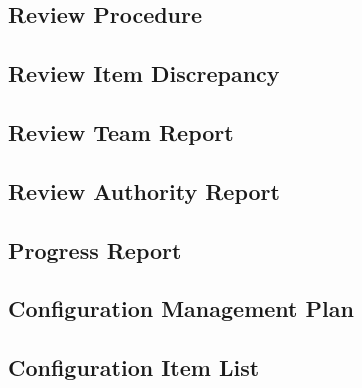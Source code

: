 \subsection{Review Procedure}
\label{sec:Review Procedure}


\subsection{Review Item Discrepancy}
\label{sec:Review Item Discrepancy}


\subsection{Review Team Report}
\label{sec:Review Team Report}


\subsection{Review Authority Report}
\label{sec:Review Authority Report}


\subsection{Progress Report}
\label{sec:Progress Report}
\begin{comment}
The progress report shall contain the following information:
1. The project manager’s assessment of the current situation in
relation to the forecasts and risks, at a level of detail agreed
between the relevant actors.
2. The status of the progress of work being performed by the
supplier.
3. Status and trends of agreed key performance and engineering data
parameters.
4. Adverse trends in technical and programmatic performance and
proposals for remedial actions.
5. Planning for implementation of remedial actions.
6. A consolidated report derived from the lower tier suppliers status
reports.
7. Progress on all actions since the previous report.
\end{comment}


\subsection{Configuration Management Plan}
\label{sec:Configuration Management Plan}


\subsection{Configuration Item List}
\label{sec:Configuration Item List}


